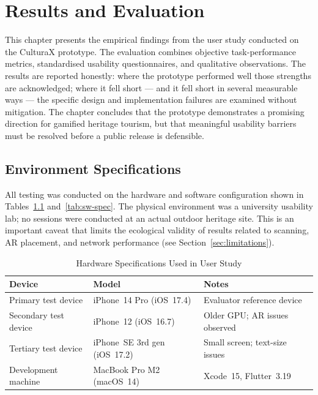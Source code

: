 
\chapter{Results and Evaluation}
\label{chap:results}

This chapter presents the empirical findings from the user study conducted on the CulturaX
prototype. The evaluation combines objective task-performance metrics, standardised usability
questionnaires, and qualitative observations. The results are reported honestly: where the
prototype performed well those strengths are acknowledged; where it fell short — and it fell
short in several measurable ways — the specific design and implementation failures are examined
without mitigation. The chapter concludes that the prototype demonstrates a promising direction
for gamified heritage tourism, but that meaningful usability barriers must be resolved before
a public release is defensible.

\section{Environment Specifications}
\label{sec:env}

All testing was conducted on the hardware and software configuration shown in
Tables~\ref{tab:hw-spec} and~\ref{tab:sw-spec}. The physical environment was a
university usability lab; no sessions were conducted at an actual outdoor heritage
site. This is an important caveat that limits the ecological validity of results
related to scanning, AR placement, and network performance (see
Section~\ref{sec:limitations}).

\begin{table}[htbp]
  \centering
  \caption{Hardware Specifications Used in User Study}
  \label{tab:hw-spec}
  \begin{tabular}{lll}
    \toprule
    \textbf{Device}         & \textbf{Model}              & \textbf{Notes} \\
    \midrule
    Primary test device     & iPhone~14 Pro (iOS~17.4)    & Evaluator reference device \\
    Secondary test device   & iPhone~12 (iOS~16.7)        & Older GPU; AR issues observed \\
    Tertiary test device    & iPhone~SE 3rd gen (iOS~17.2)& Small screen; text-size issues \\
    Development machine     & MacBook Pro M2 (macOS~14)   & Xcode~15, Flutter~3.19 \\
    \bottomrule
  \end{tabular}
\end{table}

